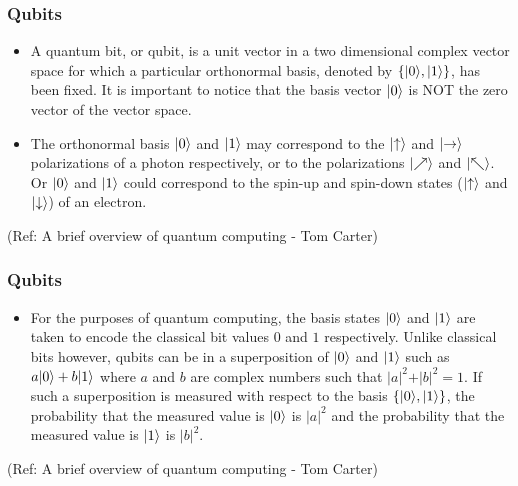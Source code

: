  \begin{frame}[fragile]\frametitle{Qubits}

\begin{itemize}
	\item A quantum bit, or qubit, is a unit vector in a two dimensional
complex vector space for which a particular orthonormal basis, denoted by
$\{|{0}\rangle, |{1}\rangle\}$, 
has been fixed. It is important to notice that the basis vector $|{0}\rangle$ is NOT the zero vector of the vector space.
\item The orthonormal basis
$|{0}\rangle$ and $|{1}\rangle$ may correspond to the $|{\uparrow}\rangle$ and 
$|{\to}\rangle$ polarizations of a photon respectively, or to the polarizations
$|{\nearrow}\rangle$ and $|{\nwarrow}\rangle$. Or $|{0}\rangle$ and $|{1}\rangle$ could 
correspond to the spin-up and spin-down states ($|{\uparrow}\rangle$ and $|{\downarrow}\rangle$) of an electron.
\end{itemize}

\tiny{(Ref: A brief overview of quantum computing - Tom Carter)}

\end{frame}

 \begin{frame}[fragile]\frametitle{Qubits}

\begin{itemize}

\item For the purposes of quantum computing, the basis states $|{0}\rangle$ and $|{1}\rangle$ 
are taken to encode the classical bit values
$0$ and $1$ respectively. 
Unlike classical bits however, qubits can be in a superposition of
$|{0}\rangle$ and $|{1}\rangle$ such as $a|{0}\rangle + b|{1}\rangle$
where $a$ and $b$ are complex numbers such that 
$\vert a\vert^2 + \vert b\vert^2 = 1$. If such a superposition is measured with
respect to the basis $\{|{0}\rangle,|{1}\rangle\}$, the probability that the 
measured value is $|{0}\rangle$ is $\vert a\vert ^2$ and the probability that the
measured value is $|{1}\rangle$ is  $\vert b\vert ^2$.

\end{itemize}

\tiny{(Ref: A brief overview of quantum computing - Tom Carter)}

\end{frame}


